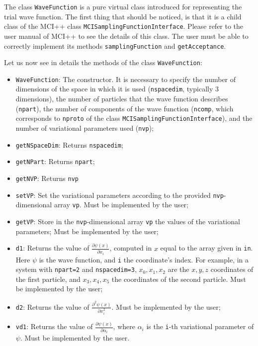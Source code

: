 \documentclass[11pt,a4paper,twoside]{article}
\begin{document}
The class \verb+WaveFunction+ is a pure virtual class introduced for representing the trial wave function.
The first thing that should be noticed, is that it is a child class of the MCI++ class \verb+MCISamplingFunctionInterface+.
Please refer to the user manual of MCI++ to see the details of this class.
The user must be able to correctly implement its methods \verb+samplingFunction+ and \verb+getAcceptance+.

Let us now see in details the methods of the class \verb+WaveFunction+:
\begin{itemize}
\item \verb+WaveFunction+: The constructor. It is necessary to specify the number of dimensions of the space in which it is used (\verb+nspacedim+, typically $3$ dimensions), the number of particles that the wave function describes (\verb+npart+), the number of components of the wave function (\verb+ncomp+, which corresponds to \verb+nproto+ of the class \verb+MCISamplingFunctionInterface+), and the number of variational parameters used (\verb+nvp+);
\item \verb+getNSpaceDim+: Returns \verb+nspacedim+;
\item \verb+getNPart+: Returns \verb+npart+;
\item \verb+getNVP+: Returns \verb+nvp+
\item \verb+setVP+: Set the variational parameters according to the provided \verb+nvp+-dimensional array \verb+vp+. Must be implemented by the user;
\item \verb+getVP+: Store in the \verb+nvp+-dimensional array \verb+vp+ the values of the variational parameters; Must be implemented by the user;
\item \verb+d1+: Returns the value of $\frac{\partial \psi(x)}{\partial x_{i}}$, computed in $x$ equal to the array given in \verb+in+. Here $\psi$ is the wave function, and \verb+i+ the coordinate's index. For example, in a system with \verb+npart=2+ and \verb+nspacedim=3+, $x_0, x_1, x_2$ are the $x,y,z$ coordinates of the first particle, and $x_3,x_4,x_5$ the coordinates of the second particle. Must be implemented by the user;
\item \verb+d2+: Returns the value of $\frac{\partial^2 \psi(x)}{\partial x_{i}^2}$. Must be implemented by the user;
\item \verb+vd1+: Returns the value of $\frac{\partial \psi(x)}{\partial \alpha_{i}}$, where $\alpha_i$ is the \verb+i+-th variational parameter of $\psi$. Must be implemented by the user.
\end{itemize}
\end{document}
